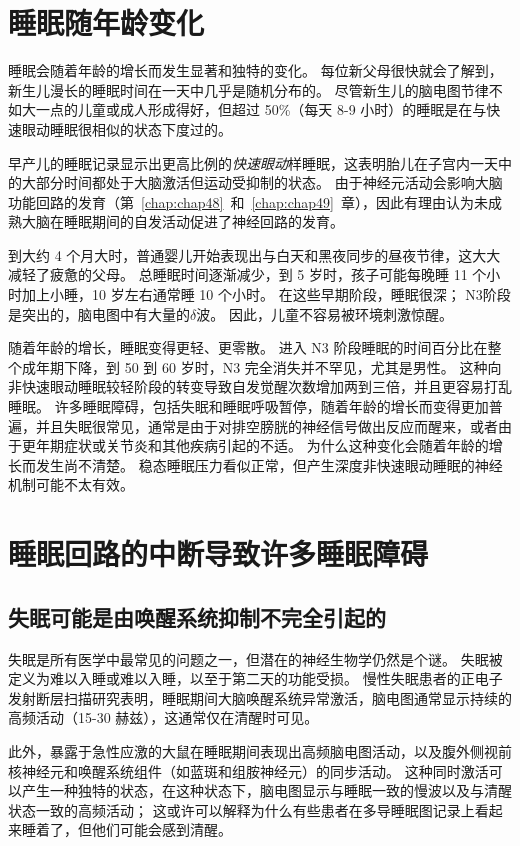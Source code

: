 \section{睡眠随年龄变化}

睡眠会随着年龄的增长而发生显著和独特的变化。
每位新父母很快就会了解到，新生儿漫长的睡眠时间在一天中几乎是随机分布的。
尽管新生儿的脑电图节律不如大一点的儿童或成人形成得好，但超过 50\%（每天 8-9 小时）的睡眠是在与快速眼动睡眠很相似的状态下度过的。


早产儿的睡眠记录显示出更高比例的\textit{快速眼动}样睡眠，这表明胎儿在子宫内一天中的大部分时间都处于大脑激活但运动受抑制的状态。
由于神经元活动会影响大脑功能回路的发育（第~\ref{chap:chap48}~和~\ref{chap:chap49}~章），因此有理由认为未成熟大脑在睡眠期间的自发活动促进了神经回路的发育。


到大约 4 个月大时，普通婴儿开始表现出与白天和黑夜同步的昼夜节律，这大大减轻了疲惫的父母。
总睡眠时间逐渐减少，到 5 岁时，孩子可能每晚睡 11 个小时加上小睡，10 岁左右通常睡 10 个小时。
在这些早期阶段，睡眠很深；
N3阶段是突出的，脑电图中有大量的$ \delta $波。
因此，儿童不容易被环境刺激惊醒。


随着年龄的增长，睡眠变得更轻、更零散。
进入 N3 阶段睡眠的时间百分比在整个成年期下降，到 50 到 60 岁时，N3 完全消失并不罕见，尤其是男性。
这种向非快速眼动睡眠较轻阶段的转变导致自发觉醒次数增加两到三倍，并且更容易打乱睡眠。
许多睡眠障碍，包括失眠和睡眠呼吸暂停，随着年龄的增长而变得更加普遍，并且失眠很常见，通常是由于对排空膀胱的神经信号做出反应而醒来，或者由于更年期症状或关节炎和其他疾病引起的不适。
为什么这种变化会随着年龄的增长而发生尚不清楚。
稳态睡眠压力看似正常，但产生深度非快速眼动睡眠的神经机制可能不太有效。


\section{睡眠回路的中断导致许多睡眠障碍}

\subsection{失眠可能是由唤醒系统抑制不完全引起的}

失眠是所有医学中最常见的问题之一，但潜在的神经生物学仍然是个谜。
失眠被定义为难以入睡或难以入睡，以至于第二天的功能受损。
慢性失眠患者的正电子发射断层扫描研究表明，睡眠期间大脑唤醒系统异常激活，脑电图通常显示持续的高频活动（15-30 赫兹），这通常仅在清醒时可见。


此外，暴露于急性应激的大鼠在睡眠期间表现出高频脑电图活动，以及腹外侧视前核神经元和唤醒系统组件（如蓝斑和组胺神经元）的同步活动。
这种同时激活可以产生一种独特的状态，在这种状态下，脑电图显示与睡眠一致的慢波以及与清醒状态一致的高频活动；
这或许可以解释为什么有些患者在多导睡眠图记录上看起来睡着了，但他们可能会感到清醒。


